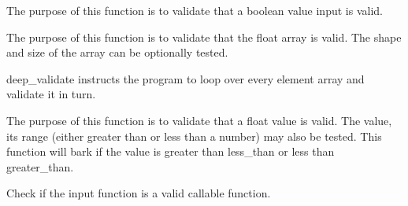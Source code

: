 \documentclass[letterpaper,10pt,english]{sphinxmanual}
\begin{document}

\begin{fulllineitems}
\label{\detokenize{Robustness.validation:Robustness.validation.validate_boolean_value}}
The purpose of this function is to validate that a boolean value
input is valid.

\end{fulllineitems}


\begin{fulllineitems}
\label{\detokenize{Robustness.validation:Robustness.validation.validate_float_array}}
The purpose of this function is to validate that the float array is
valid. The shape and size of the array can be optionally tested.

deep\_validate instructs the program to loop over every element array and
validate it in turn.

\end{fulllineitems}


\begin{fulllineitems}
\label{\detokenize{Robustness.validation:Robustness.validation.validate_float_value}}
The purpose of this function is to validate that a float value is valid.
The value, its range (either greater than or less than a number) may
also be tested. This function will bark if the value is greater than
less\_than or less than greater\_than.

\end{fulllineitems}


\begin{fulllineitems}
\label{\detokenize{Robustness.validation:Robustness.validation.validate_function_call}}
Check if the input function is a valid callable function.

\end{fulllineitems}
\end{document}
